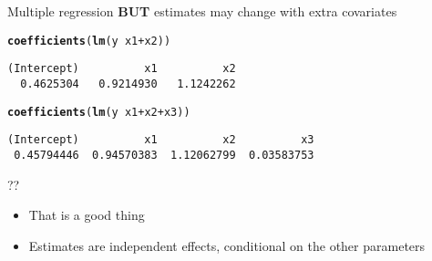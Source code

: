 \documentclass[10pt]{beamer}\usepackage[]{graphicx}\usepackage[]{color}
\makeatletter
\newcommand{\hlopt}[1]{\textcolor[rgb]{0,0,0}{#1}}%
\newcommand{\hlstd}[1]{\textcolor[rgb]{0.345,0.345,0.345}{#1}}%
\newcommand{\hlkwd}[1]{\textcolor[rgb]{0.737,0.353,0.396}{\textbf{#1}}}%
\newenvironment{kframe}{%
 \def\at@end@of@kframe{}%
 \ifinner\ifhmode%
  \def\at@end@of@kframe{\end{minipage}}%
  \begin{minipage}{\columnwidth}%
 \fi\fi%
 \def\FrameCommand##1{\hskip\@totalleftmargin \hskip-\fboxsep
 \colorbox{shadecolor}{##1}\hskip-\fboxsep
     \hskip-\linewidth \hskip-\@totalleftmargin \hskip\columnwidth}%
 \MakeFramed {\advance\hsize-\width
   \@totalleftmargin\z@ \linewidth\hsize
   \@setminipage}}%
 {\par\unskip\endMakeFramed%
 \at@end@of@kframe}
\newenvironment{knitrout}{}{} %
\makeatother
\begin{document}
\begin{frame}[fragile]{Multiple regression}
\textbf{BUT} estimates may change with extra covariates
\begin{knitrout}\small
{}\color{fgcolor}\begin{kframe}
\begin{alltt}
    \hlkwd{coefficients}\hlstd{(}\hlkwd{lm}\hlstd{(y} \hlopt{~} \hlstd{x1} \hlopt{+} \hlstd{x2 ))}
\end{alltt}
\begin{verbatim}
(Intercept)          x1          x2 
  0.4625304   0.9214930   1.1242262 
\end{verbatim}
\begin{alltt}
    \hlkwd{coefficients}\hlstd{(}\hlkwd{lm}\hlstd{(y} \hlopt{~} \hlstd{x1} \hlopt{+} \hlstd{x2} \hlopt{+} \hlstd{x3))}
\end{alltt}
\begin{verbatim}
(Intercept)          x1          x2          x3 
 0.45794446  0.94570383  1.12062799  0.03583753 
\end{verbatim}
\end{kframe}
\end{knitrout}
\pause
\begin{block}{??}
  \begin{itemize}
    \item That is a good thing
    \item Estimates are independent effects, conditional on the other parameters
  \end{itemize}
\end{block}
\end{frame}
\end{document}
